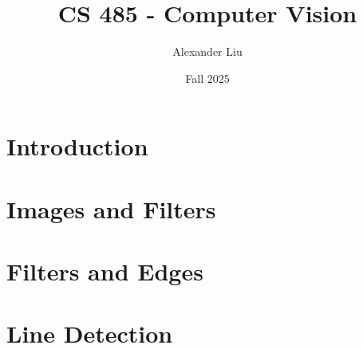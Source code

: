 \documentclass[10pt, oneside]{article}
\title{CS 485 - Computer Vision}
\author{Alexander Liu}
\date{Fall 2025}
\begin{document}
\maketitle
\tableofcontents

\vspace{.25in}
\newpage

\section{Introduction}


\section{Images and Filters}


\section{Filters and Edges}


\section{Line Detection}



\end{document}
